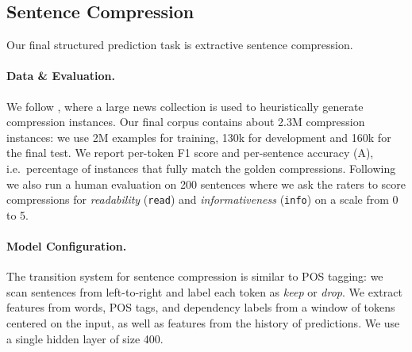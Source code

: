 
\subsection{Sentence Compression}

Our final structured prediction task is extractive sentence compression.

\paragraph{Data \& Evaluation.}

We follow , where a large news collection is used to
heuristically generate compression instances.
Our final corpus contains about 2.3M compression instances: we use 2M examples
for training, 130k for development and 160k for the final test.
We report per-token F1 score and per-sentence accuracy (A), i.e.~percentage of
instances that fully match the golden compressions.
Following~ we also run a human evaluation on 200
sentences where we ask the raters to score compressions for \textit{readability}
(\texttt{read}) and \textit{informativeness} (\texttt{info}) on a scale from 0
to 5.

\paragraph{Model Configuration.}

The transition system for sentence compression is similar to POS
tagging: we scan sentences from left-to-right and label each token as
\textit{keep} or \textit{drop}.
We extract features from words, POS tags, and dependency labels from a window of
tokens centered on the input, as well as features from the history of
predictions.
We use a single hidden layer of size 400.

\begin{table}
  \centering%
  \caption{\label{tab:compression-eval}
    Sentence compression results on News data.
    {\em Automatic} refers to application of the same automatic extraction rules used to generate
    the News training corpus.
  }
\end{table}


